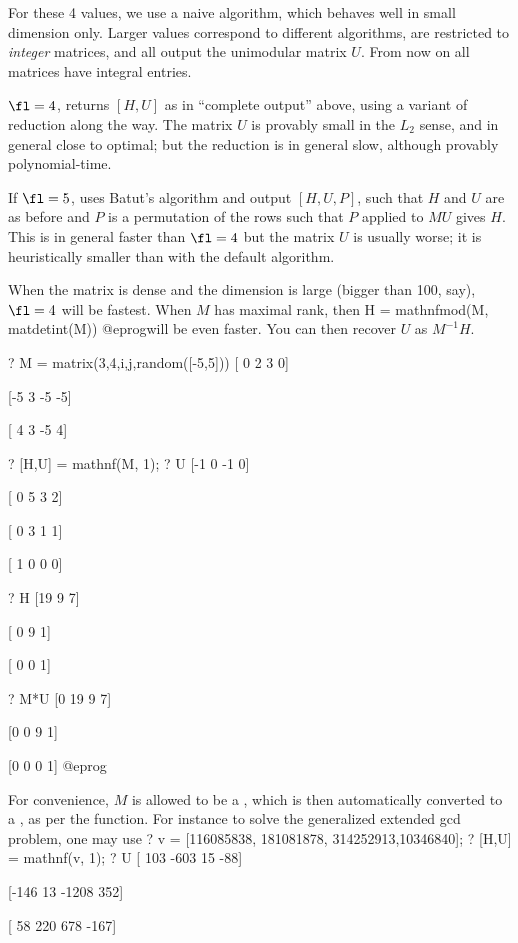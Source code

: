 \noindent For these 4 values, we use a naive algorithm, which behaves well
in small dimension only. Larger values correspond to different algorithms,
are restricted to \emph{integer} matrices, and all output the unimodular
matrix $U$. From now on all matrices have integral entries.

\item $\fl=4$, returns $[H,U]$ as in ``complete output'' above, using a
variant of  reduction along the way. The matrix $U$ is provably
small in the $L_2$ sense, and in general close to optimal; but the
reduction is in general slow, although provably polynomial-time.

If $\fl=5$, uses Batut's algorithm and output $[H,U,P]$, such that $H$ and
$U$ are as before and $P$ is a permutation of the rows such that $P$ applied
to $MU$ gives $H$. This is in general faster than $\fl=4$ but the matrix $U$
is usually worse; it is heuristically smaller than with the default algorithm.

When the matrix is dense and the dimension is large (bigger than 100, say),
$\fl = 4$ will be fastest. When $M$ has maximal rank, then
\bprog
  H = mathnfmod(M, matdetint(M))
@eprog\noindent will be even faster. You can then recover $U$ as $M^{-1}H$.

\bprog
? M = matrix(3,4,i,j,random([-5,5]))
[ 0 2  3  0]

[-5 3 -5 -5]

[ 4 3 -5  4]

? [H,U] = mathnf(M, 1);
? U
[-1 0 -1 0]

[ 0 5  3 2]

[ 0 3  1 1]

[ 1 0  0 0]

? H
[19 9 7]

[ 0 9 1]

[ 0 0 1]

? M*U
[0 19 9 7]

[0  0 9 1]

[0  0 0 1]
@eprog

For convenience, $M$ is allowed to be a , which is then
automatically converted to a , as per the  function.
For instance to solve the generalized extended gcd problem, one may use
\bprog
? v = [116085838, 181081878, 314252913,10346840];
? [H,U] = mathnf(v, 1);
? U
[ 103 -603    15  -88]

[-146   13 -1208  352]

[  58  220   678 -167]

